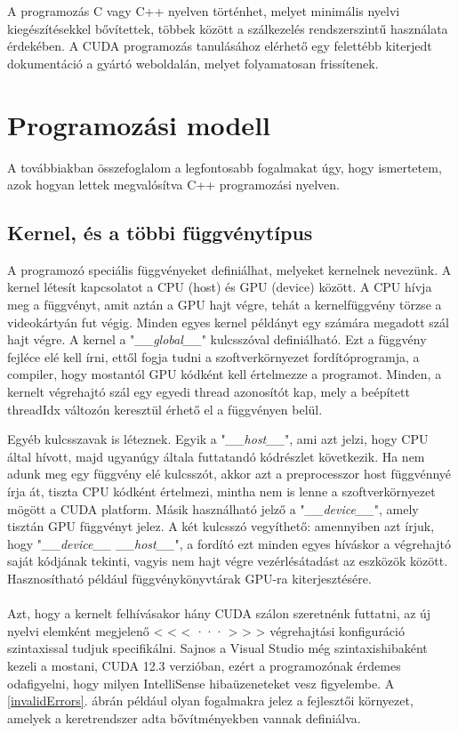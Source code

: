 A programozás C vagy C++ nyelven történhet, melyet minimális nyelvi kiegészítésekkel bővítettek, többek között a szálkezelés rendszerszintű használata érdekében. A CUDA programozás tanulásához elérhető egy felettébb kiterjedt dokumentáció a gyártó weboldalán, melyet folyamatosan frissítenek. \cite{CUDAdoc}

\section{Programozási modell }
A továbbiakban összefoglalom a legfontosabb fogalmakat úgy, hogy ismertetem, azok hogyan lettek megvalósítva C++ programozási nyelven.

\subsection{Kernel, és a többi függvénytípus}
A programozó speciális függvényeket definiálhat, melyeket kernelnek nevezünk. A kernel létesít kapcsolatot a CPU (host) és GPU (device) között. A CPU hívja meg a függvényt, amit aztán a GPU hajt végre, tehát a kernelfüggvény törzse a videokártyán fut végig. Minden egyes kernel példányt egy számára megadott szál hajt végre.
A kernel a "\textit{\_\_global\_\_}" kulcsszóval definiálható. Ezt a függvény fejléce elé kell írni, ettől fogja tudni a szoftverkörnyezet fordítóprogramja, a compiler, hogy mostantól GPU kódként kell értelmezze a programot. Minden, a kernelt végrehajtó szál egy egyedi thread azonosítót kap, mely a beépített threadIdx változón keresztül érhető el a függvényen belül.

Egyéb kulcsszavak is léteznek. Egyik a "\textit{\_\_host\_\_}", ami azt jelzi, hogy CPU által hívott, majd ugyanúgy általa futtatandó kódrészlet következik. Ha nem adunk meg egy függvény elé kulcsszót, akkor azt a preprocesszor host függvénnyé írja át, tiszta CPU kódként értelmezi, mintha nem is lenne a szoftverkörnyezet mögött a CUDA platform. Másik használható jelző a "\textit{\_\_device\_\_}", amely tisztán GPU függvényt jelez. A két kulcsszó vegyíthető: amennyiben azt írjuk, hogy "\textit{\_\_device\_\_ \_\_host\_\_}", a fordító ezt minden egyes híváskor a végrehajtó saját kódjának tekinti, vagyis nem hajt végre vezérlésátadást az eszközök között. Hasznosítható például függvénykönyvtárak GPU-ra kiterjesztésére.

\paragraph{}
Azt, hogy a kernelt felhívásakor hány CUDA szálon szeretnénk futtatni, az új nyelvi elemként megjelenő < < < ··· > > > végrehajtási konfiguráció szintaxissal tudjuk specifikálni. Sajnos a Visual Studio még szintaxishibaként kezeli a mostani, CUDA 12.3 verzióban, ezért a programozónak érdemes odafigyelni, hogy milyen IntelliSense hibaüzeneteket vesz figyelembe. A \ref{invalidErrors}. ábrán például olyan fogalmakra jelez a fejlesztői környezet, amelyek a keretrendszer adta bővítményekben vannak definiálva. 



